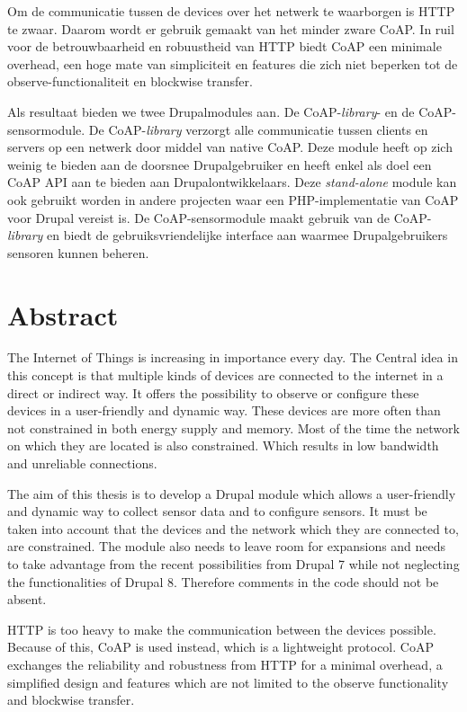 {Om de communicatie tussen de devices over het netwerk te waarborgen is HTTP te zwaar. Daarom wordt er gebruik gemaakt van het minder zware CoAP. In ruil voor de betrouwbaarheid en robuustheid van HTTP biedt CoAP een minimale overhead, een hoge mate van simpliciteit en features die zich niet beperken tot de observe-functionaliteit en blockwise transfer.

Als resultaat bieden we twee Drupalmodules aan. De CoAP-\textit{library}- en de CoAP-sensormodule. De CoAP-\textit{library} verzorgt alle communicatie tussen clients en servers op een netwerk door middel van native CoAP. Deze module heeft op zich weinig te bieden aan de doorsnee Drupalgebruiker en heeft enkel als doel een CoAP API aan te bieden aan Drupalontwikkelaars. Deze \textit{stand-alone} module kan ook gebruikt worden in andere projecten waar een PHP-implementatie van CoAP voor Drupal vereist is. De CoAP-sensormodule maakt gebruik van de CoAP-\textit{library} en biedt de gebruiksvriendelijke interface aan waarmee Drupalgebruikers sensoren kunnen beheren.

\section*{Abstract}
The Internet of Things is increasing in importance every day. The Central idea in this concept is that multiple kinds of devices are connected to the internet in a direct or indirect way. It offers the possibility to observe or configure these devices in a user-friendly and dynamic way. These devices are more often than not constrained in both energy supply and memory. Most of the time the network on which they are located is also constrained. Which results in low bandwidth and unreliable connections. 

The aim of this thesis is to develop a Drupal module which allows a user-friendly and dynamic way to collect sensor data and to configure sensors. It must be taken into account that the devices and the network which they are connected to, are constrained. The module also needs to leave room for expansions and needs to take advantage from the recent possibilities from Drupal 7 while not neglecting the functionalities of Drupal 8. Therefore comments in the code should not be absent. 

HTTP is too heavy to make the communication between the devices possible. Because of this, CoAP is used instead, which is a lightweight protocol. CoAP exchanges the reliability and robustness from HTTP for a minimal overhead, a simplified design and features which are not limited to the observe functionality and blockwise transfer.

}
